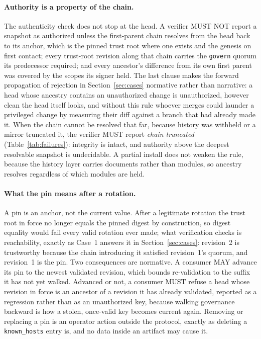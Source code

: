 \documentclass[11pt,a4paper]{article}
\begin{document}
\paragraph{Authority is a property of the chain.}
The authenticity check does not stop at the head. A verifier MUST NOT report a
snapshot as authorized unless the first-parent chain resolves from the head
back to its anchor, which is the pinned trust root where one exists and the
genesis on first contact; every trust-root revision along that chain carries
the \texttt{govern} quorum its predecessor required; and every ancestor's
difference from its own first parent was covered by the scopes its signer
held. The last clause makes the forward propagation of rejection in
Section~\ref{sec:cases} normative rather than narrative: a head whose ancestry
contains an unauthorized change is unauthorized, however clean the head itself
looks, and without this rule whoever merges could launder a privileged change
by measuring their diff against a branch that had already made it. When the
chain cannot be resolved that far, because history was withheld or a mirror
truncated it, the verifier MUST report \emph{chain truncated}
(Table~\ref{tab:failures}): integrity is intact, and authority above the
deepest resolvable snapshot is undecidable. A partial install does not weaken
the rule, because the history layer carries documents rather than modules, so
ancestry resolves regardless of which modules are held.

\paragraph{What the pin means after a rotation.}
A pin is an anchor, not the current value. After a legitimate rotation the
trust root in force no longer equals the pinned digest by construction, so
digest equality would fail every valid rotation ever made; what verification
checks is reachability, exactly as Case~1 answers it in
Section~\ref{sec:cases}: revision~2 is trustworthy because the chain
introducing it satisfied revision~1's quorum, and revision~1 is the pin. Two
consequences are normative. A consumer MAY advance its pin to the newest
validated revision, which bounds re-validation to the suffix it has not yet
walked. Advanced or not, a consumer MUST refuse a head whose revision in
force is an ancestor of a revision it has already validated, reported as a
regression rather than as an unauthorized key, because walking governance
backward is how a stolen, once-valid key becomes current again. Removing or
replacing a pin is an operator action outside the protocol, exactly as
deleting a \texttt{known\_hosts} entry is, and no data inside an artifact
may cause it.
\end{document}
